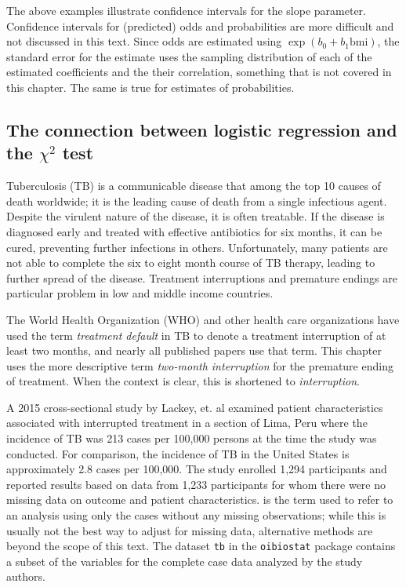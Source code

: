 The above examples illustrate confidence intervals for the slope parameter.  Confidence intervals for (predicted) odds and probabilities are more difficult and not discussed in this text.  Since odds are estimated using $\exp(b_0 + b_1 \textrm{bmi})$, the standard error for the estimate uses the sampling distribution of each of the estimated coefficients and the their correlation, something that is not covered in this chapter.  The same is true for estimates of probabilities.


\subsection{The connection between logistic regression and the $\chi^2$ test}\label{section:logisticChiSqTest}

Tuberculosis (TB) is a communicable disease that among the top 10 causes of death worldwide; it is the leading cause of death from a single infectious agent.   Despite the virulent nature of the disease, it is often treatable.  If the disease is diagnosed early and treated with effective antibiotics for six months, it can be cured, preventing further infections in others. Unfortunately, many patients are not able to complete the six to eight month course of TB therapy, leading to further spread of the disease.  Treatment interruptions and premature endings are particular problem in low and middle income countries.

The World Health Organization (WHO) and other health care organizations have used the term \textit{treatment default} in TB to denote a treatment interruption of at least two months, and nearly all published papers use that term. This chapter uses the more descriptive term \textit{two-month interruption} for the premature ending of treatment.  When the context is clear, this is shortened to \textit{interruption}.

A 2015 cross-sectional study by Lackey, et. al   examined patient characteristics associated with interrupted treatment in a section of Lima, Peru where the incidence of TB was 213 cases per 100,000 persons at the time the study was conducted. For comparison, the incidence of TB in the United States is approximately 2.8 cases per 100,000.   The study enrolled 1,294 participants and reported results based on data from 1,233 participants for whom there were no missing data on outcome and patient characteristics.  is the term used to refer to an analysis using only the cases without any missing observations; while this is usually not the best way to adjust for missing data, alternative methods are beyond the scope of this text. The dataset \texttt{tb} in the \texttt{oibiostat} package contains a subset of the variables for the complete case data analyzed by the study authors.


